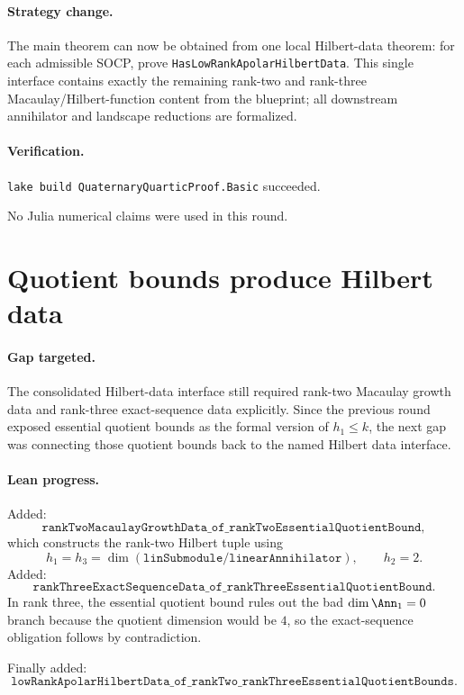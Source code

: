 \documentclass[11pt]{article}
\begin{document}
\paragraph{Strategy change.}
The main theorem can now be obtained from one local Hilbert-data theorem:
for each admissible SOCP, prove \texttt{HasLowRankApolarHilbertData}.  This
single interface contains exactly the remaining rank-two and rank-three
Macaulay/Hilbert-function content from the blueprint; all downstream
annihilator and landscape reductions are formalized.

\paragraph{Verification.}
\texttt{lake build QuaternaryQuarticProof.Basic} succeeded.

No Julia numerical claims were used in this round.

\section*{Quotient bounds produce Hilbert data}

\paragraph{Gap targeted.}
The consolidated Hilbert-data interface still required rank-two Macaulay
growth data and rank-three exact-sequence data explicitly.  Since the previous
round exposed essential quotient bounds as the formal version of \(h_1\le k\),
the next gap was connecting those quotient bounds back to the named Hilbert
data interface.

\paragraph{Lean progress.}
Added:
\[
\texttt{rankTwoMacaulayGrowthData\_of\_rankTwoEssentialQuotientBound},
\]
which constructs the rank-two Hilbert tuple using
\[
h_1=h_3=\dim(\texttt{linSubmodule}/\texttt{linearAnnihilator}),\qquad h_2=2.
\]
Added:
\[
\texttt{rankThreeExactSequenceData\_of\_rankThreeEssentialQuotientBound}.
\]
In rank three, the essential quotient bound rules out the bad
\(\dim\Ann_1=0\) branch because the quotient dimension would be \(4\), so the
exact-sequence obligation follows by contradiction.

Finally added:
\[
\texttt{lowRankApolarHilbertData\_of\_rankTwo\_rankThreeEssentialQuotientBounds}.
\]
\end{document}
